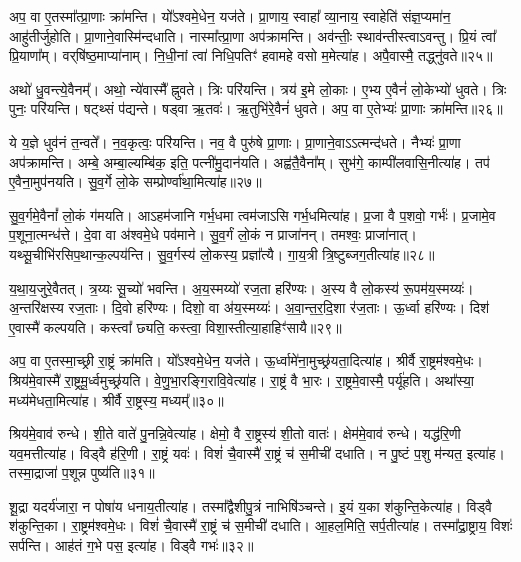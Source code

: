 अप॒ वा ए॒तस्मा᳚त्प्रा॒णाः क्रा॑मन्ति।
यो᳚ऽश्वमे॒धेन॒ यज॑ते।
प्रा॒णाय॒ स्वाहा᳚ व्या॒नाय॒ स्वाहेति॑ संज्ञ॒प्यमा॑न॒ आहु॑तीर्जुहोति।
प्रा॒णाने॒वास्मि॑न्दधाति।
नास्मा᳚त्प्रा॒णा अप॑क्रामन्ति।
अव॑न्तीः॒ स्थाव॑न्तीस्त्वा\-ऽवन्तु।
प्रि॒यं त्वा᳚ प्रि॒याणा᳚म्।
वर्‌\mbox{}षि॑ष्ठ॒माप्या॑नाम्।
नि॒धी॒नां त्वा॑ निधि॒पतिꣳ॑ हवामहे वसो म॒मेत्या॑ह।
अपै॒वास्मै॒ तद्ध्नु॑वते॥२५॥\ip

अथो॑ धु॒वन्त्ये॒वैनम्᳚।
अथो॒ न्ये॑वास्मै᳚ ह्नुवते।
त्रिः परि॑यन्ति।
त्रय॑ इ॒मे लो॒काः।
ए॒भ्य ए॒वैनं॑ लो॒केभ्यो॑ धुवते।
त्रिः पुनः॒ परि॑यन्ति।
षट्थ्सं प॑द्यन्ते।
षड्वा ऋ॒तवः॑।
ऋ॒तुभि॑रे॒वैनं॑ धुवते।
अप॒ वा ए॒तेभ्यः॑ प्रा॒णाः क्रा॑मन्ति॥२६॥\ip

ये य॒ज्ञे धुव॑नं त॒न्वते᳚।
न॒व॒कृत्वः॒ परि॑यन्ति।
नव॒ वै पुरु॑षे प्रा॒णाः।
प्रा॒णाने॒वाऽऽत्मन्द॑धते।
नैभ्यः॑ प्रा॒णा अप॑क्रामन्ति।
अम्बे॒ अम्बा॒ल्यम्बि॑क॒ इति॒ पत्नी॑मु॒दान॑यति।
अह्व॑तै॒वैना᳚म्।
सुभ॑गे॒ काम्पी॑लवासि॒नीत्या॑ह।
तप॑ ए॒वैना॒मुप॑नयति।
सु॒व॒र्गे लो॒के सम्प्रोर्ण्वा॑था॒मित्या॑ह॥२७॥\ip

सु॒व॒र्गमे॒वैनां᳚ लो॒कं ग॑मयति।
आऽहम॑जानि गर्भ॒धमा त्वम॑जाऽसि गर्भ॒धमित्या॑ह।
प्र॒जा वै प॒शवो॒ गर्भः॑।
प्र॒जामे॒व प॒शूना॒त्मन्ध॑त्ते।
दे॒वा वा अ॑श्वमे॒धे पव॑माने।
सु॒व॒र्गं लो॒कं न प्राजा॑नन्।
तमश्वः॒ प्राजा॑नात्।
यथ्सू॒चीभि॑रसिप॒थान्क॒ल्पय॑न्ति।
सु॒व॒र्गस्य॑ लो॒कस्य॒ प्रज्ञा᳚त्यै।
गा॒य॒त्री त्रि॒ष्टुब्जग॒तीत्या॑ह॥२८॥\ip

य॒था॒\-य॒जु\-रे॒वै\-तत्।
त्र॒य्यः सू॒च्यो॑ भवन्ति।
अ॒य॒स्मय्यो॑ रज॒ता हरि॑ण्यः।
अ॒स्य वै लो॒कस्य॑ रू॒पम॑य॒स्मय्यः॑।
अ॒न्तरि॑क्षस्य रज॒ताः।
दि॒वो हरि॑ण्यः।
दिशो॒ वा अ॑य॒स्मय्यः॑।
अ॒वा॒न्त॒र॒दि॒शा र॑ज॒ताः।
ऊ॒र्ध्वा हरि॑ण्यः।
दिश॑ ए॒वास्मै॑ कल्पयति।
कस्त्वा᳚ छ्यति॒ कस्त्वा॒ विशा॒स्तीत्या॒हाहिꣳ॑सायै॥२९॥\ip\anuvakamend[ह्नु॒व॒ते॒ क्रा॒म॒न्त्यू॒र्ण्वा॒था॒मित्या॑ह॒ जग॒तीत्या॑ह कल्पय॒त्येकं॑ च]

अप॒ वा ए॒तस्मा॒च्छ्री रा॒ष्ट्रं क्रा॑मति।
यो᳚ऽश्वमे॒धेन॒ यज॑ते।
ऊ॒र्ध्वामे॑ना॒मुच्छ्र॑यता॒दित्या॑ह।
श्रीर्वै रा॒ष्ट्रम॑श्वमे॒धः।
श्रिय॑मे॒वास्मै॑ रा॒ष्ट्रमू॒र्ध्वमुच्छ्र॑यति।
वे॒णु॒भा॒रङ्गि॒रावि॒वेत्या॑ह।
रा॒ष्ट्रं वै भा॒रः।
रा॒ष्ट्रमे॒वास्मै॒ पर्यू॑हति।
अथा᳚स्या॒ मध्य॑मेधता॒मित्या॑ह।
श्रीर्वै रा॒ष्ट्रस्य॒ मध्यम्᳚॥३०॥\ip

श्रिय॑मे॒वाव॑ रुन्धे।
शी॒ते वाते॑ पु॒नन्नि॒वेत्या॑ह।
क्षेमो॒ वै रा॒ष्ट्रस्य॑ शी॒तो वातः॑।
क्षेम॑मे॒वाव॑ रुन्धे।
यद्ध॑रि॒णी यव॒मत्तीत्या॑ह।
विड्वै ह॑रि॒णी।
रा॒ष्ट्रं यवः॑।
विशं॑ चै॒वास्मै॑ रा॒ष्ट्रं च॑ स॒मीची॑ दधाति।
न पु॒ष्टं प॒शु म॑न्यत॒ इत्या॑ह।
तस्मा॒द्राजा॑ प॒शून्न पुष्य॑ति॥३१॥\ip

शू॒द्रा यदर्य॑जारा॒ न पोषा॑य धनाय॒तीत्या॑ह।
तस्मा᳚द्वैशीपु॒त्रं नाभिषि॑ञ्चन्ते।
इ॒यं य॒का श॑कुन्ति॒केत्या॑ह।
विड्वै श॑कुन्ति॒का।
रा॒ष्ट्रम॑श्वमे॒धः।
विशं॑ चै॒वास्मै॑ रा॒ष्ट्रं च॑ स॒मीची॑ दधाति।
आ॒हल॒मिति॒ सर्प॒तीत्या॑ह।
तस्मा᳚द्रा॒ष्ट्राय॒ विशः॑ सर्पन्ति।
आह॑तं ग॒भे पस॒ इत्या॑ह।
विड्वै गभः॑॥३२॥\ip

